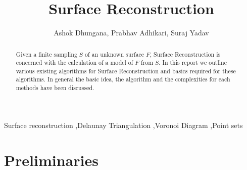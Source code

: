 \documentclass[preprint,5p,times,twocolumn]{elsarticle}
\begin{document}
\begin{frontmatter}



\title{Surface Reconstruction}


\author{Ashok Dhungana, Prabhav Adhikari, Suraj Yadav}

\address{National Institute of Technology Calicut}


\begin{abstract}
Given a finite sampling $S$ of an unknown surface $F$, Surface Reconstruction is concerned with the calculation of a model of $F$ from $S$. In this report we outline various existing algorithms for Surface Reconstruction and basics required for these algorithms. In general the basic idea, the algorithm and the complexities for each methods have been discussed. 
\end{abstract}

\begin{keyword}
Surface reconstruction \sep Delaunay Triangulation \sep Voronoi Diagram \sep Point sets

\end{keyword}

\end{frontmatter}


\section{Preliminaries}
\end{document}
